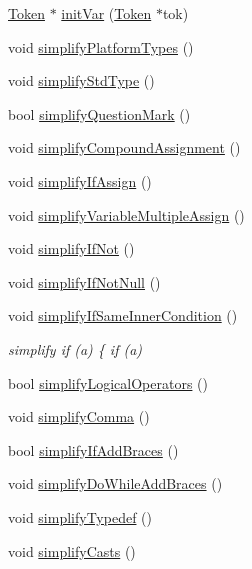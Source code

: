 \begin{DoxyCompactItemize}
\item 
\hyperlink{class_token}{Token} $\ast$ \hyperlink{class_tokenizer_a878a8e74f252434cacc94da05f24930f}{init\-Var} (\hyperlink{class_token}{Token} $\ast$tok)
\item 
void \hyperlink{class_tokenizer_a70690e32b126df2dce134c1cb8542165}{simplify\-Platform\-Types} ()
\item 
void \hyperlink{class_tokenizer_a5519b36a3247039f62ad79c337db830f}{simplify\-Std\-Type} ()
\item 
bool \hyperlink{class_tokenizer_a46e303554fa55788896fd7bd55e7f584}{simplify\-Question\-Mark} ()
\item 
void \hyperlink{class_tokenizer_ae34b725995514febb57844b0d8232cb7}{simplify\-Compound\-Assignment} ()
\item 
void \hyperlink{class_tokenizer_abcf346281ac3152cbb01dd6d3a03eae8}{simplify\-If\-Assign} ()
\item 
void \hyperlink{class_tokenizer_afa8a373a3f98712b4bbbd4a32e0841fa}{simplify\-Variable\-Multiple\-Assign} ()
\item 
void \hyperlink{class_tokenizer_abc71845367bb4bd26d7636c6f0993920}{simplify\-If\-Not} ()
\item 
void \hyperlink{class_tokenizer_a9cca5b02e36e92f4925798e071696928}{simplify\-If\-Not\-Null} ()
\item 
void \hyperlink{class_tokenizer_acf5d58cd6c9dada077e0ff8c3326edbd}{simplify\-If\-Same\-Inner\-Condition} ()
\begin{DoxyCompactList}\small\item\em simplify if (a) \{ if (a) \end{DoxyCompactList}\item 
bool \hyperlink{class_tokenizer_a9634f50a1164a4440992c4020caf1374}{simplify\-Logical\-Operators} ()
\item 
void \hyperlink{class_tokenizer_a46acc4f15217af35d073729dbf1d5cef}{simplify\-Comma} ()
\item 
bool \hyperlink{class_tokenizer_af88af70b74d3d880ba7509604ca432ac}{simplify\-If\-Add\-Braces} ()
\item 
void \hyperlink{class_tokenizer_a32860c1f0ff867719cef87b6cacfedeb}{simplify\-Do\-While\-Add\-Braces} ()
\item 
void \hyperlink{class_tokenizer_a4adb4d624e0238e2482e452c92298c78}{simplify\-Typedef} ()
\item 
void \hyperlink{class_tokenizer_a20b9968c92ee46da537d9fe341ab40f6}{simplify\-Casts} ()
\item 

\end{DoxyCompactItemize}
